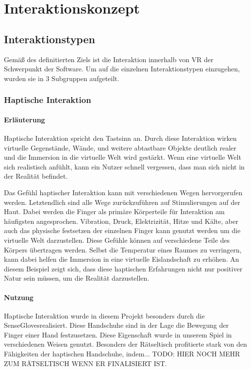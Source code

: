 \chapter{Interaktionskonzept}

\section{Interaktionstypen}
Gemäß des definitierten Ziels ist die Interaktion innerhalb von VR der Schwerpunkt der Software. Um auf die einzelnen Interaktionstypen einzugehen, wurden sie in 3 Subgruppen aufgeteilt.

\subsection{Haptische Interaktion}

\subsubsection{Erläuterung}
Haptische Interaktion spricht den Tastsinn an. Durch diese Interaktion wirken virtuelle Gegenstände, Wände, und weitere abtastbare Objekte deutlich realer und die Immersion in die virtuelle Welt wird gestärkt. Wenn eine virtuelle Welt sich realistisch anfühlt, kann ein Nutzer schnell vergessen, dass man sich nicht in der Realität befindet.

Das Gefühl haptischer Interaktion kann mit verschiedenen Wegen hervorgerufen werden. Letztendlich sind alle Wege zurückzuführen auf Stimulierungen auf der Haut. Dabei werden die Finger als primäre Körperteile für Interaktion am häufigsten angesprochen. Vibration, Druck, Elektrizität, Hitze und Kälte, aber auch das physische festsetzen der einzelnen Finger kann genutzt werden um die virtuelle Welt darzustellen. Diese Gefühle können auf verschiedene Teile des Körpers übertragen werden. Selbst die Temperatur eines Raumes zu verringern, kann dabei helfen die Immersion in eine virtuelle Eislandschaft zu erhöhen. An diesem Beispiel zeigt sich, dass diese haptischen Erfahrungen nicht nur positiver Natur sein müssen, um die Realität darzustellen.

\subsubsection{Nutzung}
Haptische Interaktion wurde in diesem Projekt besonders durch die \dq SenseGloves\dq realisiert. Diese Handschuhe sind in der Lage die Bewegung der Finger einer Hand festzusetzen. Diese Eigenschaft wurde in unserem Spiel in verschiedenen Weisen genutzt. Besonders der Rätseltisch profitierte stark von den Fähigkeiten der haptischen Handschuhe, indem... TODO: HIER NOCH MEHR ZUM RÄTSELTISCH WENN ER FINALISIERT IST.

